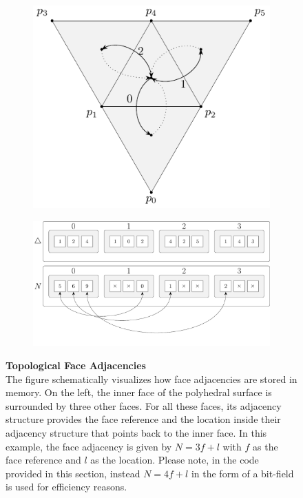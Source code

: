 \documentclass{stdlocal}
\begin{document}
  \begin{figure}
    \centering
    \begin{subfigure}[c]{0.38\linewidth}
      \centering
      \includegraphics[width=\linewidth]{figures/polyhedral-surface-triangle-adjacencies.pdf}
    \end{subfigure}
    \hfill
    \begin{subfigure}[c]{0.60\linewidth}
      \centering
      \includegraphics[width=\linewidth]{figures/polyhedral-surface-triangle-adjacencies-struct.pdf}
    \end{subfigure}
    \caption[Topological Face Adjacencies]{
      \textbf{Topological Face Adjacencies}\\
      The figure schematically visualizes how face adjacencies are stored in memory.
      On the left, the inner face of the polyhedral surface is surrounded by three other faces.
      For all these faces, its adjacency structure provides the face reference and the location inside their adjacency structure that points back to the inner face.
      In this example, the face adjacency is given by $N = 3f + l$ with $f$ as the face reference and $l$ as the location.
      Please note, in the code provided in this section, instead $N = 4f + l$ in the form of a bit-field is used for efficiency reasons.
    }
    \label{fig:polyhedral-surface-face-adjacencies}
  \end{figure}
\end{document}
